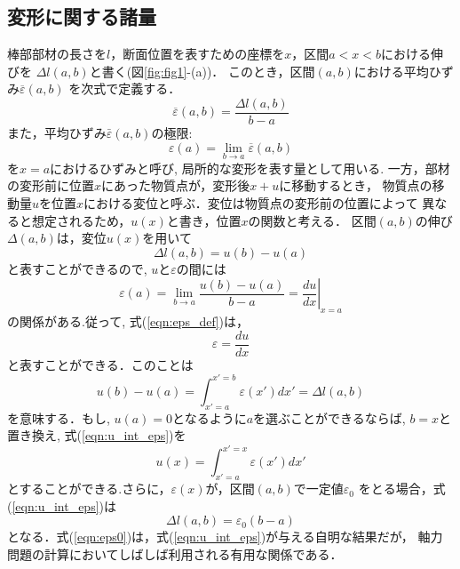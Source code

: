 \documentclass[10pt,a4j]{jarticle}
\begin{document}
\subsection{変形に関する諸量}
棒部部材の長さを$l$，断面位置を表すための座標を$x$，区間$a<x<b$における伸びを
$\Delta l (a,b)$と書く(図\ref{fig:fig1}-(a))．
このとき，区間$(a,b)$における平均ひずみ$\overline{\varepsilon}(a,b)$
を次式で定義する．
\begin{equation}
	\overline{\varepsilon}(a,b) =\frac{\Delta l (a,b)}{b-a}
	\label{eqn:eps_bar}
\end{equation}
また，平均ひずみ$\bar{\varepsilon}(a,b)$の極限:
\begin{equation}
	\varepsilon(a)=\lim_{b \rightarrow a}\overline{\varepsilon}(a,b)
	\label{eqn:eps_def}
\end{equation}
を$x=a$におけるひずみと呼び, 局所的な変形を表す量として用いる. 
一方，部材の変形前に位置$x$にあった物質点が，変形後$x+u$に移動するとき，
物質点の移動量$u$を位置$x$における変位と呼ぶ．変位は物質点の変形前の位置によって
異なると想定されるため，$u(x)$と書き，位置$x$の関数と考える．
区間$(a,b)$の伸び$\Delta(a,b)$は，変位$u(x)$を用いて
\begin{equation}
	\Delta l(a,b)=u(b)-u(a)
	\label{eqn:dell_u}
\end{equation}
と表すことができるので, $u$と$\varepsilon$の間には
\begin{equation}
	\varepsilon(a) = \lim _{b\rightarrow a} \frac{u(b)-u(a)}{b-a}= \left.\frac{du}{dx}\right|_{x=a}
	\label{eqn:eps_u}
\end{equation}
の関係がある.従って, 式(\ref{eqn:eps_def})は，
\begin{equation}
	\varepsilon=\frac{du}{dx}
	\label{eqn:e_dudx}
\end{equation}
と表すことができる．このことは
\begin{equation}
	u(b)-u(a)=\int_{x'=a}^{x'=b} \varepsilon(x') dx'=\Delta l (a,b)
	\label{eqn:u_int_eps}
\end{equation}
を意味する．もし, $u(a)=0$となるように$a$を選ぶことができるならば, 
$b=x$と置き換え, 式(\ref{eqn:u_int_eps})を
\begin{equation}
	u(x)=\int_{x'=a}^{x'=x} \varepsilon(x') dx'
	\label{eqn:u_int_eps0}
\end{equation}
とすることができる.さらに，$\varepsilon(x)$が，区間$(a,b)$で一定値$\varepsilon_0$
をとる場合，式(\ref{eqn:u_int_eps})は
\begin{equation}
	\Delta l(a,b)=\varepsilon_0 (b-a)
	\label{eqn:eps0}
\end{equation}
となる．式(\ref{eqn:eps0})は，式(\ref{eqn:u_int_eps})が与える自明な結果だが，
軸力問題の計算においてしばしば利用される有用な関係である．
\end{document}
